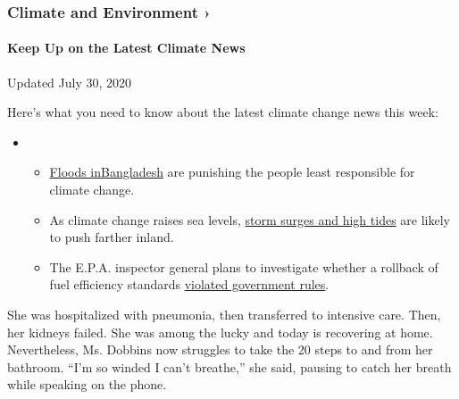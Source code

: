 \href{https://www.nytimes.com/section/climate?action=click\&pgtype=Article\&state=default\&region=MAIN_CONTENT_1\&context=storylines_keepup}{}

\hypertarget{climate-and-environment-}{%
\subsubsection{Climate and Environment
›}\label{climate-and-environment-}}

\hypertarget{keep-up-on-the-latest-climate-news}{%
\paragraph{Keep Up on the Latest Climate
News}\label{keep-up-on-the-latest-climate-news}}

Updated July 30, 2020

Here's what you need to know about the latest climate change news this
week:

\begin{itemize}
\item
  \begin{itemize}
  \tightlist
  \item
    \href{https://www.nytimes.com/2020/07/30/climate/bangladesh-floods.html?action=click\&pgtype=Article\&state=default\&region=MAIN_CONTENT_1\&context=storylines_keepup}{Floods
    in}\href{https://www.nytimes.com/2020/07/30/climate/bangladesh-floods.html?action=click\&pgtype=Article\&state=default\&region=MAIN_CONTENT_1\&context=storylines_keepup}{Bangladesh}
    are punishing the people least responsible for climate change.
  \item
    As climate change raises sea levels,
    \href{https://www.nytimes.com/2020/07/30/climate/sea-level-inland-floods.html?action=click\&pgtype=Article\&state=default\&region=MAIN_CONTENT_1\&context=storylines_keepup}{storm
    surges and high tides} are likely to push farther inland.
  \item
    The E.P.A. inspector general plans to investigate whether a rollback
    of fuel efficiency standards
    \href{https://www.nytimes.com/2020/07/27/climate/trump-fuel-efficiency-rule.html?action=click\&pgtype=Article\&state=default\&region=MAIN_CONTENT_1\&context=storylines_keepup}{violated
    government rules}.
  \end{itemize}
\end{itemize}

She was hospitalized with pneumonia, then transferred to intensive care.
Then, her kidneys failed. She was among the lucky and today is
recovering at home. Nevertheless, Ms. Dobbins now struggles to take the
20 steps to and from her bathroom. ``I'm so winded I can't breathe,''
she said, pausing to catch her breath while speaking on the phone.


